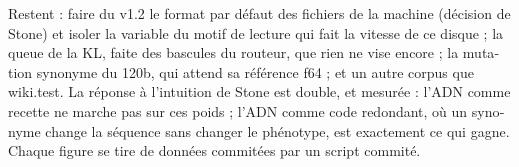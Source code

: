 \begin{otherlanguage}{french}
Restent : faire du v1.2 le format par défaut des fichiers de la machine (décision de Stone) et isoler la variable du motif de lecture qui fait la vitesse de ce disque ; la queue de la KL, faite des bascules du routeur, que rien ne vise encore ; la mutation synonyme du 120b, qui attend sa référence f64 ; et un autre corpus que wiki.test. La réponse à l'intuition de Stone est double, et mesurée : l'ADN comme recette ne marche pas sur ces poids ; l'ADN comme code redondant, où un synonyme change la séquence sans changer le phénotype, est exactement ce qui gagne. Chaque figure se tire de données commitées par un script commité.
\end{otherlanguage}
\endgroup
